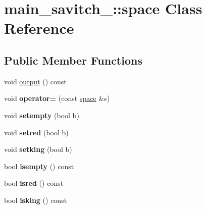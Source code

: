 \hypertarget{classmain__savitch__14_1_1space}{}\section{main\+\_\+savitch\+\_\+:\+:space Class Reference}
\label{classmain__savitch__14_1_1space}
\subsection*{Public Member Functions}
\begin{DoxyCompactItemize}
\item 
void \hyperlink{classmain__savitch__14_1_1space_af92c58946054e4926569298671a6f27f}{output} () const 
\item 
void {\bfseries operator=} (const \hyperlink{classmain__savitch__14_1_1space}{space} \&s)\hypertarget{classmain__savitch__14_1_1space_a69bbbde78eb80714e40fe9797155ff97}{}\label{classmain__savitch__14_1_1space_a69bbbde78eb80714e40fe9797155ff97}

\item 
void {\bfseries setempty} (bool b)\hypertarget{classmain__savitch__14_1_1space_a81042116b78c65aa54681a3046cf729e}{}\label{classmain__savitch__14_1_1space_a81042116b78c65aa54681a3046cf729e}

\item 
void {\bfseries setred} (bool b)\hypertarget{classmain__savitch__14_1_1space_aec4e5034b7016efd659f2ca73646ce68}{}\label{classmain__savitch__14_1_1space_aec4e5034b7016efd659f2ca73646ce68}

\item 
void {\bfseries setking} (bool b)\hypertarget{classmain__savitch__14_1_1space_a1d05ca01c48db5a08c3e4696714f2a60}{}\label{classmain__savitch__14_1_1space_a1d05ca01c48db5a08c3e4696714f2a60}

\item 
bool {\bfseries isempty} () const \hypertarget{classmain__savitch__14_1_1space_a6f16d044c905025f3c2c3c5162c5540c}{}\label{classmain__savitch__14_1_1space_a6f16d044c905025f3c2c3c5162c5540c}

\item 
bool {\bfseries isred} () const \hypertarget{classmain__savitch__14_1_1space_a0b28606018052b2a5821a4dd53069804}{}\label{classmain__savitch__14_1_1space_a0b28606018052b2a5821a4dd53069804}

\item 
bool {\bfseries isking} () const \hypertarget{classmain__savitch__14_1_1space_a28902760d81ef0b9bab177a5c8da2b2f}{}\label{classmain__savitch__14_1_1space_a28902760d81ef0b9bab177a5c8da2b2f}

\end{DoxyCompactItemize}


